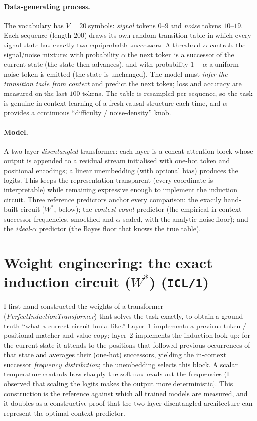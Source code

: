 \documentclass[12pt]{article}
\begin{document}
\paragraph{Data-generating process.} The vocabulary has $V=20$ symbols: \emph{signal} tokens
$0\text{--}9$ and \emph{noise} tokens $10\text{--}19$. Each sequence (length $200$) draws its own
random transition table in which every signal state has exactly two equiprobable successors. A
threshold $\alpha$ controls the signal/noise mixture: with probability $\alpha$ the next token is a
successor of the current state (the state then advances), and with probability $1-\alpha$ a uniform
noise token is emitted (the state is unchanged). The model must \emph{infer the transition table
from context} and predict the next token; loss and accuracy are measured on the last $100$ tokens.
The table is resampled per sequence, so the task is genuine in-context learning of a fresh causal
structure each time, and $\alpha$ provides a continuous ``difficulty / noise-density'' knob.

\paragraph{Model.} A two-layer \emph{disentangled} transformer: each layer is a concat-attention
block whose output is appended to a residual stream initialised with one-hot token and positional
encodings; a linear unembedding (with optional bias) produces the logits. This keeps the
representation transparent (every coordinate is interpretable) while remaining expressive enough to
implement the induction circuit. Three reference predictors anchor every comparison: the
exactly hand-built circuit (\emph{$W^{*}$}, below); the \emph{context-count} predictor (the
empirical in-context successor frequencies, smoothed and $\alpha$-scaled, with the analytic noise
floor); and the \emph{ideal-$\alpha$} predictor (the Bayes floor that knows the true table).

\section{Weight engineering: the exact induction circuit ($W^{*}$) (\texttt{ICL/1})}
I first hand-constructed the weights of a transformer (\emph{PerfectInductionTransformer}) that
solves the task exactly, to obtain a ground-truth ``what a correct circuit looks like.'' Layer~1
implements a previous-token / positional matcher and value copy; layer~2 implements the induction
look-up: for the current state it attends to the positions that followed previous occurrences of
that state and averages their (one-hot) successors, yielding the in-context successor
\emph{frequency distribution}; the unembedding selects this block. A scalar temperature controls
how sharply the softmax reads out the frequencies (I observed that scaling the logits makes the
output more deterministic). This construction is the reference against which all trained models are
measured, and it doubles as a constructive proof that the two-layer disentangled architecture can
represent the optimal context predictor.
\end{document}
